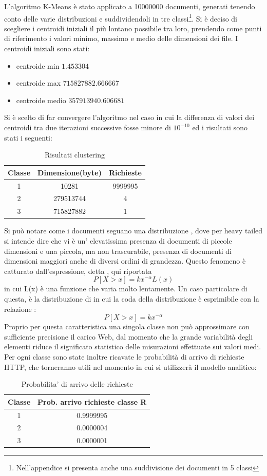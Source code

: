 L'algoritmo K-Means è stato applicato a 10000000 documenti, generati tenendo conto delle varie distribuzioni e suddividendoli in tre classi\footnote{Nell'appendice si presenta anche una suddivisione dei documenti in 5 classi}. Si è deciso di scegliere i centroidi iniziali il più lontano possibile tra loro, prendendo come punti di riferimento i valori minimo, massimo e medio delle dimensioni dei file. I centroidi iniziali sono stati:
\begin{itemize}
\item centroide min $1.453304$
\item centroide max $715827882.666667 $
\item centroide medio $357913940.606681 $
\end{itemize}
Si è scelto di far convergere l'algoritmo nel caso in cui la differenza di valori dei centroidi tra due iterazioni successive fosse minore di $10^{-10}$ ed i risultati sono stati i seguenti: 
\begin{table}[htbp]
\begin{center}
\begin{tabular}{||c|c|c||}
\hline
Classe	&Dimensione(byte)		&Richieste \\ 
\hline\hline
1 &10281 &9999995\\ \hline
2 &279513744 &4 \\ \hline
3 &715827882 &1 \\ \hline
\end{tabular}
\end{center}
\caption{Risultati clustering}
\label{risclustering}
\end{table}
Si può notare come i documenti seguano una distribuzione , dove per heavy tailed si intende dire che vi è un' elevatissima presenza di documenti di piccole dimensioni e una piccola, ma non trascurabile, presenza di documenti di dimensioni maggiori anche di diversi ordini di grandezza. Questo fenomeno è catturato dall'espressione, detta , qui riportata 
$$P[X > x] = kx^{-\alpha}L(x)$$
in cui L(x) è una funzione che varia molto lentamente. 
Un caso particolare di questa, è la distribuzione di  in cui la coda della distribuzione è esprimibile con la relazione :
$$P[X > x] = kx^{-\alpha}$$
Proprio per questa caratteristica una singola classe non può approssimare con sufficiente precisione il carico Web, dal momento che la grande variabilità degli elementi riduce il significato statistico delle misurazioni effettuate sui valori medi. 
Per ogni classe sono state inoltre ricavate le probabilità di arrivo di richieste HTTP, che torneranno utili nel momento in cui si utilizzerà il modello analitico: 
\begin{table}[H]
\begin{center}
\begin{tabular}{||c|c||}
\hline
Classe		&Prob. arrivo richieste classe R	\\
\hline
\hline
1		&0.9999995	\\
\hline
2		&0.0000004\\
\hline
3		&0.0000001\\
\hline
\end{tabular}
\end{center}
\caption{Probabilita' di arrivo delle richieste}
\label{test_2}
\end{table}
